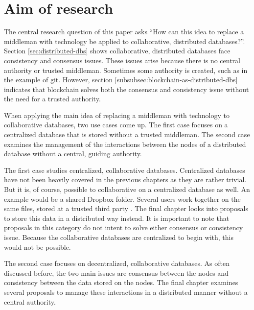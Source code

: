 \chapter{Aim of research}

\iffalse
- start with consensus and consistency in col. distr. dbs => because no central authority
- pivot into main idea: have technology replace an indispensable middleman. As discussed in \ref{subsec:examples-distributed-dbs}, blockchains solve both issues very well. 
- to apply the main idea to collaborative databases: two approaches. First a centralized collaborative database can be stored without a middleman. Second, the interaction between a nodes of a distributed collaborative database can be managed without a middleman
- For the first approach, the final chapter looks into proposals to store data in a distributed manner. Every proposal is examined on advantages, disadvantages, viability and current implementations.
- Concerning the second approach, the last chapter focuses on proposals to manage the interaction 
\fi

The central research question of this paper asks ``How can this idea to replace a middleman with technology be applied to collaborative, distributed databases?''. Section \ref{sec:distributed-dbs} shows collaborative, distributed databases face consistency and consensus issues. These issues arise because there is no central authority or trusted middleman. Sometimes some authority is created, such as in the example of git. However, section \ref{subsubsec:blockchain-as-distributed-dbs} indicates that blockchain solves both the consensus and consistency issue without the need for a trusted authority.

When applying the main idea of replacing a middleman with technology to collaborative databases, two use cases come up. The first case focuses on a centralized database that is stored without a trusted middleman. The second case examines the management of the interactions between the nodes of a distributed database without a central, guiding authority.

The first case studies centralized, collaborative databases. Centralized databases have not been heavily covered in the previous chapters as they are rather trivial. But it is, of course, possible to collaborative on a centralized database as well. An example would be a shared Dropbox folder. Several users work together on the same files, stored at a trusted third party \cite{dropbox-sharing}. The final chapter looks into proposals to store this data in a distributed way instead. It is important to note that proposals in this category do not intent to solve either consensus or consistency issue. Because the collaborative databases are centralized to begin with, this would not be possible.

The second case focuses on decentralized, collaborative databases. As often discussed before, the two main issues are consensus between the nodes and consistency between the data stored on the nodes. The final chapter examines several proposals to manage these interactions in a distributed manner without a central authority.


